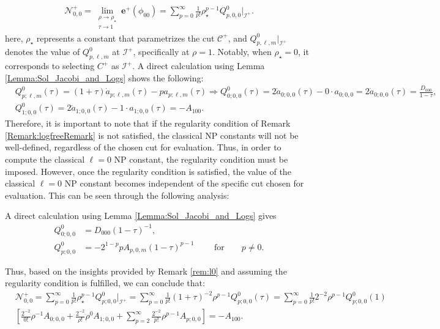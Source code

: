 \begin{align}
  \mathcal{N}^{+}_{0,0}= \lim_{\substack{\rho \to \rho_{\star} \\ \tau \to 1}}  \boldsymbol{e}^{+}(\phi_{00}) = \sum_{p=0}^{\infty} \frac{1}{p!}\rho^{p-1}_{\star}Q^{0}_{p,0,0}|_{\mathscr{I}^{+}}.
\end{align}
here, $\rho_{\star}$ represents a constant that parametrizes the cut $\mathcal{C}^{+}$, and $Q^{0}_{p,\ell,m}|_{\mathscr{I}^{+}}$ denotes the value of $Q^{0}_{p,\ell,m}$ at $\mathscr{I}^{+}$, specifically at $\rho=1$. Notably, when $\rho_{\star}=0$, it corresponds to selecting ${C}^{+}$ as $\mathcal{I}^{+}$.
A direct calculation using Lemma \ref{Lemma:Sol_Jacobi_and_Logs} shows the following:
\begin{align}\label{eq:Q0lm}
  & Q_{p;\ell,m}^{0}(\tau)=(1+\tau) \dot{a}_{p ; \ell, m}(\tau)-pa_{p ; \ell, m}(\tau) \Rightarrow Q_{0;0,0}^{0}(\tau)=2 \dot{a}_{0;0,0}(\tau)-0 \cdot a_{0;0,0} =2 \dot{a}_{0;0,0}(\tau)=\frac{D_{000}}{1-\tau}, \\
  & Q_{1;0,0}^{0}(\tau)=2 \dot{a}_{1;0,0}(\tau)-1 \cdot a_{1;0,0}(\tau)=-A_{100}.
\end{align}
Therefore, it is important to note that if the regularity condition of Remark \ref{Remark:logfreeRemark} is not satisfied, the classical NP constants will not be well-defined, regardless of the chosen cut for evaluation. Thus, in order to compute the classical $\ell=0$ NP constant, the regularity condition must be imposed. However, once the regularity condition is satisfied, the value of the classical $\ell=0$ NP constant becomes independent of the specific cut chosen for evaluation. This can be seen through the following analysis:
\begin{remark}\label{rem:l0}
  A direct calculation
using Lemma \ref{Lemma:Sol_Jacobi_and_Logs}
gives
 \begin{subequations}\label{eq:rem:l0}
 \begin{align}
   Q^{0}_{0;0,0}&=D_{000}(1-\tau)^{-1},\label{rem:l0:eq1} \\
   Q^{0}_{p;0,0}&=-2^{1-p}pA_{p,0,m}(1-\tau)^{p-1} \qquad \text{ for}\qquad p\neq 0.
   \label{rem:l0:eq2}
 \end{align}
\end{subequations}
\end{remark}
Thus, based on the insights provided by Remark \ref{rem:l0} and assuming the regularity condition is fulfilled, we can conclude that:
\begin{align}
  &\mathcal{N}^{+}_{0,0}= \sum_{p=0}^{\infty} \frac{1}{p!}\rho^{p-1}_{\star}Q^{0}_{p;0,0}|_{\mathscr{I}^{+}} = \sum_{p=0}^{\infty} \frac{1}{p !}(1+\tau)^{-2} \rho^{p-1} Q_{p; 0,0}^{0}(\tau) = \sum_{p=0}^{\infty} \frac{1}{p !} 2^{-2} \rho^{p-1} Q_{p; 0,0}^{0}(1) \nonumber \\
  & \left[\frac{2^{-2}}{0 !} \rho^{-1} A_{0;0,0} +\frac{2^{-2}}{\rho !} \rho^{0} A_{1;0,0} +\sum_{p=2}^{\infty} \frac{2^{-2}}{p !} \rho^{p-1} A_{p;0,0}\right] = -A_{100}.
\end{align}

